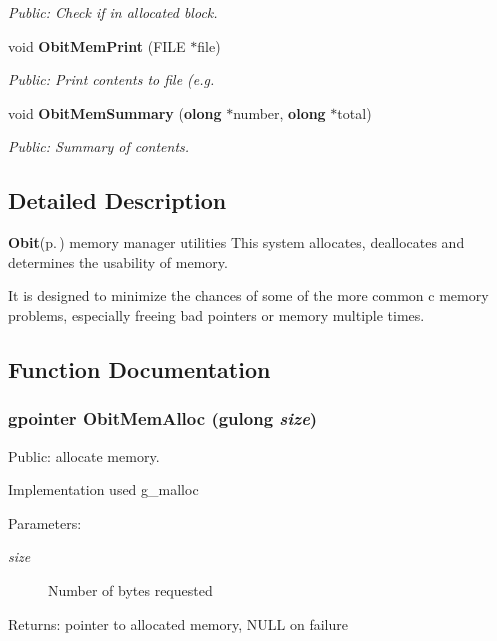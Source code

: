 \begin{CompactItemize}
\begin{CompactList}\small\item\em Public: Check if in allocated block. \item\end{CompactList}\item 
void {\bf Obit\-Mem\-Print} (FILE $\ast$file)
\begin{CompactList}\small\item\em Public: Print contents to file (e.g. \item\end{CompactList}\item 
void {\bf Obit\-Mem\-Summary} ({\bf olong} $\ast$number, {\bf olong} $\ast$total)
\begin{CompactList}\small\item\em Public: Summary of contents. \item\end{CompactList}\end{CompactItemize}


\subsection{Detailed Description}
{\bf Obit}{\rm (p.\,\pageref{structObit})} memory manager utilities This system allocates, deallocates and determines the usability of memory. 

It is designed to minimize the chances of some of the more common c memory problems, especially freeing bad pointers or memory multiple times.

\subsection{Function Documentation}
\subsubsection{\setlength{\rightskip}{0pt plus 5cm}gpointer Obit\-Mem\-Alloc (gulong {\em size})}\label{ObitMem_8h_a1}


Public: allocate memory. 

Implementation used g\_\-malloc \begin{Desc}
\item[Parameters:]
\begin{description}
\item[{\em size}]Number of bytes requested \end{description}
\end{Desc}
\begin{Desc}
\item[Returns:]pointer to allocated memory, NULL on failure \end{Desc}
